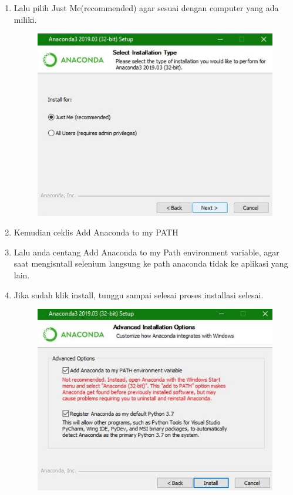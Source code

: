 \begin{enumerate}
\begin{figure}[!htbp]
        \label{gambar 1}
    \end{figure}
    \item Lalu pilih Just Me(recommended) agar sesuai dengan computer yang ada miliki.
    \begin{figure}[!htbp]
        \centering
        \includegraphics[scale=0.6]{figure/Anaconda/4.jpeg}
        \label{gambar 1}
    \end{figure}
           \vspace{2cm}
    \item Kemudian ceklis Add Anaconda to my PATH
    \item Lalu anda centang Add Anaconda to my Path environment variable, agar saat mengisntall selenium langsung ke path anaconda tidak ke aplikasi yang lain.
    \item Jika sudah klik install, tunggu sampai selesai proses installasi selesai.
    \begin{figure}[!htbp]
        \centering
        \includegraphics[scale=0.6]{figure/Anaconda/5.jpeg}

\end{figure}
\end{enumerate}

